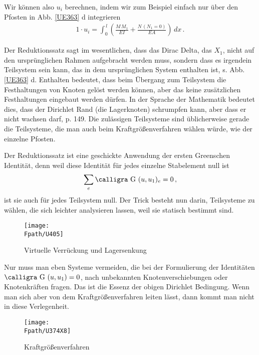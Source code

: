 {{{{{Wir k\"{o}nnen also $u_i$ berechnen, indem wir zum Beispiel einfach nur \"{u}ber den Pfosten in Abb. \ref{UE363} d integrieren
\begin{align}\label{Eq158}
1 \cdot u_i = \int_0^{\,l} (\frac{M\,M_1}{EI} + \frac{N\,(N_1 = 0)}{EA})\,dx\,.
\end{align}


Der Reduktionssatz sagt im wesentlichen, dass das Dirac Delta, das $X_1$, nicht auf den urspr\"{u}nglichen Rahmen aufgebracht werden muss, sondern dass es irgendein { Teilsystem} sein kann, das in dem urspr\"{u}nglichen System \glq enthalten\grq{} ist, s. Abb. \ref{UE363} d. Enthalten bedeutet, dass beim \"{U}bergang zum Teilsystem die Festhaltungen von Knoten gel\"{o}st werden k\"{o}nnen, aber das keine zus\"{a}tzlichen Festhaltungen eingebaut werden d\"{u}rfen. In der Sprache der Mathematik bedeutet dies, dass der { Dirichlet Rand} (die Lagerknoten) schrumpfen kann, aber dass er nicht wachsen darf, \cite{Ha6} p. 149. Die zul\"{a}ssigen Teilsysteme sind \"{u}blicherweise gerade die Teilsysteme, die man auch beim Kraftgr\"{o}{\ss}enverfahren w\"{a}hlen w\"{u}rde, wie der einzelne Pfosten.

Der Reduktionssatz ist eine geschickte Anwendung der ersten Greenschen Identit\"{a}t, denn weil diese Identit\"{a}t f\"{u}r jedes einzelne Stabelement null ist
\begin{align}
\sum_e \text{\normalfont\calligra G\,\,}(u,u_1)_{e} = 0\,,
\end{align}
ist sie auch f\"{u}r jedes Teilsystem null. Der \glq Trick\grq{} besteht nun darin, Teilsysteme zu w\"{a}hlen, die sich leichter analysieren lassen, weil sie statisch bestimmt sind.
\begin{figure}[tbp]
\centering
\if {} \sidecaption[t] \fi
\texttt{[image: \\Fpath/U405]}
\caption{Virtuelle Verr\"{u}ckung und Lagersenkung} \label{U405}
\end{figure}%

Nur muss man eben Systeme vermeiden, die bei der Formulierung der Identit\"{a}ten $\text{\normalfont\calligra G\,\,}(u, u_1) = 0$, nach unbekannten Knotenverschiebungen oder Knotenkr\"{a}ften fragen. Das ist die Essenz der obigen \glq Dirichlet Bedingung\grq{}. Wenn man sich aber von dem Kraftgr\"{o}{\ss}enverfahren leiten l\"{a}sst, dann kommt man nicht in diese Verlegenheit.
\begin{figure}[tbp]
\centering
\if {} \sidecaption[t] \fi
\texttt{[image: \\Fpath/U374X8]}
\caption{Kraftgr\"{o}{\ss}enverfahren} \label{U374}
\end{figure}%

}}}}}
